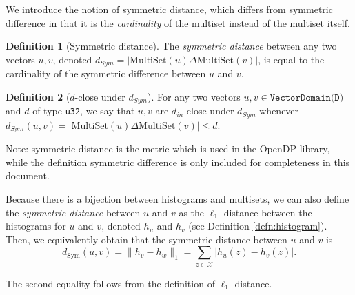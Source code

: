 \documentclass[11pt,a4paper]{article}
\theoremstyle{definition}
\newtheorem{definition}{Definition}[section]
\newcommand{\MultiSet}{\mathrm{MultiSet}}
\newcommand{\din}{d_{in}}
\newcommand{\silvia}[1]{{ {\color{blue}{(silvia)~#1}}}}
\newcommand{\grace}[1]{{ {\color{purple}{(grace)~#1}}}}
\newcommand{\connor}[1]{{ {\color{teal}{(connor)~#1}}}}
\begin{document}


We introduce the notion of symmetric distance, which differs from symmetric difference in that it is the \emph{cardinality} of the multiset instead of the multiset itself.

\begin{definition}[Symmetric distance]
The \textit{symmetric distance} between any two vectors $u, v$, denoted $d_{Sym} = |\MultiSet(u) \Delta \MultiSet(v)|$, is equal to the cardinality of the symmetric difference between $u$ and $v$.
\end{definition}


\begin{definition}[$d$-close under $d_{Sym}$]
    For any two vectors $u, v \in \texttt{VectorDomain(D)}$ and $d$ of type \texttt{u32}, we say that $u, v$ are $\din$-close under $d_{Sym}$ whenever $d_{Sym}(u, v) = |\MultiSet(u) \Delta \MultiSet(v)| \leq d$. \silvia{Should this also be moved to the pseudocode defs document now that the list of domains and associated type is there?}
\end{definition}

Note: symmetric distance is the metric which is used in the OpenDP library, while the definition symmetric difference is only included for completeness in this document.

Because there is a bijection between histograms and multisets, we can also define the \emph{symmetric distance} between $u$ and $v$ as the $\ell_1$ distance between the histograms for $u$ and $v$, denoted $h_u$ and $h_v$ (see Definition \ref{defn:histogram}). Then, we equivalently obtain that the symmetric distance between $u$ and $v$ is
$$d_{\text{Sym}}(u,v) = \lVert h_{v} - h_{w}\rVert_1 = \sum_{z\in \mathcal{X}} |h_u(z) - h_{v}(z)|.$$

The second equality follows from the definition of $\ell_1$ distance.

\silvia{Add the above as claim?}

\connor{Since these definitions are all written by us, I think we could say that we're defining symmetric distance as both things.}
\end{document}
